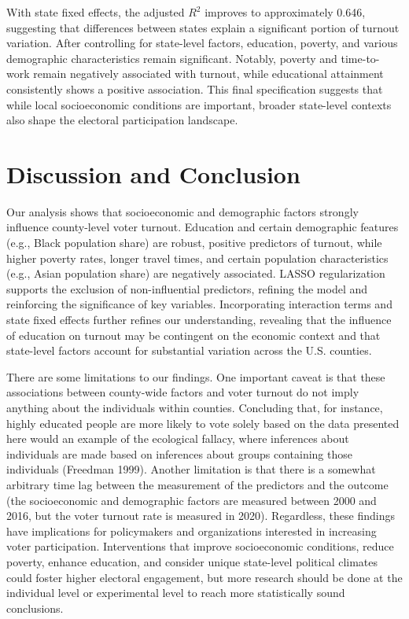 \documentclass[
]{article}
\begin{document}
With state fixed effects, the adjusted \(R^2\) improves to approximately 0.646, suggesting that differences between states
explain a significant portion of turnout variation. After controlling for state-level factors, education, poverty,
and various demographic characteristics remain significant. Notably, poverty and time-to-work remain
negatively associated with turnout, while educational attainment consistently shows a positive association.
This final specification suggests that while local socioeconomic conditions are important, broader state-level
contexts also shape the electoral participation landscape.

\section{Discussion and Conclusion}\label{discussion-and-conclusion}

Our analysis shows that socioeconomic and demographic factors strongly influence county-level voter turnout. Education and certain demographic features (e.g., Black population share) are robust, positive predictors of turnout, while higher poverty rates, longer travel times, and certain population characteristics (e.g., Asian population share) are negatively associated. LASSO regularization supports the exclusion of non-influential predictors, refining the model and reinforcing the significance of key variables. Incorporating interaction terms and state fixed effects further refines our understanding, revealing that the influence of education on turnout may be contingent on the economic context and that state-level factors account for substantial variation across the U.S. counties.

There are some limitations to our findings. One important caveat is that these associations between county-wide factors and voter turnout do not imply anything about the individuals within counties. Concluding that, for instance, highly educated people are more likely to vote solely based on the data presented here would an example of the ecological fallacy, where inferences about individuals are made based on inferences about groups containing those individuals (Freedman 1999). Another limitation is that there is a somewhat arbitrary time lag between the measurement of the predictors and the outcome (the socioeconomic and demographic factors are measured between 2000 and 2016, but the voter turnout rate is measured in 2020). Regardless, these findings have implications for policymakers and organizations interested in increasing voter participation. Interventions that improve socioeconomic conditions, reduce poverty, enhance education, and consider unique state-level political climates could foster higher electoral engagement, but more research should be done at the individual level or experimental level to reach more statistically sound conclusions.
\end{document}
